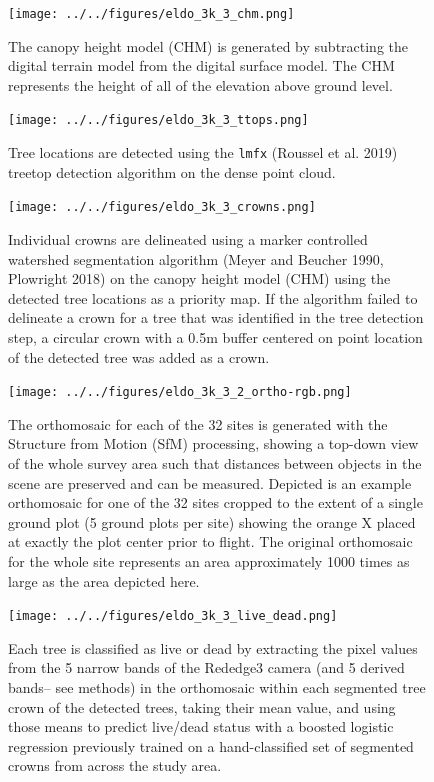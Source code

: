 \documentclass[]{article}
\begin{document}
\begin{figure}
\centering
\texttt{[image: ../../figures/eldo\_3k\_3\_chm.png]}
\caption{The canopy height model (CHM) is generated by subtracting the
digital terrain model from the digital surface model. The CHM represents
the height of all of the elevation above ground level.}
\end{figure}

\begin{figure}
\centering
\texttt{[image: ../../figures/eldo\_3k\_3\_ttops.png]}
\caption{Tree locations are detected using the \texttt{lmfx} (Roussel et
al. 2019) treetop detection algorithm on the dense point cloud.}
\end{figure}

\begin{figure}
\centering
\texttt{[image: ../../figures/eldo\_3k\_3\_crowns.png]}
\caption{Individual crowns are delineated using a marker controlled
watershed segmentation algorithm (Meyer and Beucher 1990, Plowright
2018) on the canopy height model (CHM) using the detected tree locations
as a priority map. If the algorithm failed to delineate a crown for a
tree that was identified in the tree detection step, a circular crown
with a 0.5m buffer centered on point location of the detected tree was
added as a crown.}
\end{figure}

\begin{figure}
\centering
\texttt{[image: ../../figures/eldo\_3k\_3\_2\_ortho-rgb.png]}
\caption{The orthomosaic for each of the 32 sites is generated with the
Structure from Motion (SfM) processing, showing a top-down view of the
whole survey area such that distances between objects in the scene are
preserved and can be measured. Depicted is an example orthomosaic for
one of the 32 sites cropped to the extent of a single ground plot (5
ground plots per site) showing the orange X placed at exactly the plot
center prior to flight. The original orthomosaic for the whole site
represents an area approximately 1000 times as large as the area
depicted here.}
\end{figure}

\begin{figure}
\centering
\texttt{[image: ../../figures/eldo\_3k\_3\_live\_dead.png]}
\caption{Each tree is classified as live or dead by extracting the pixel
values from the 5 narrow bands of the Rededge3 camera (and 5 derived
bands-- see methods) in the orthomosaic within each segmented tree crown
of the detected trees, taking their mean value, and using those means to
predict live/dead status with a boosted logistic regression previously
trained on a hand-classified set of segmented crowns from across the
study area.}
\end{figure}
\end{document}
